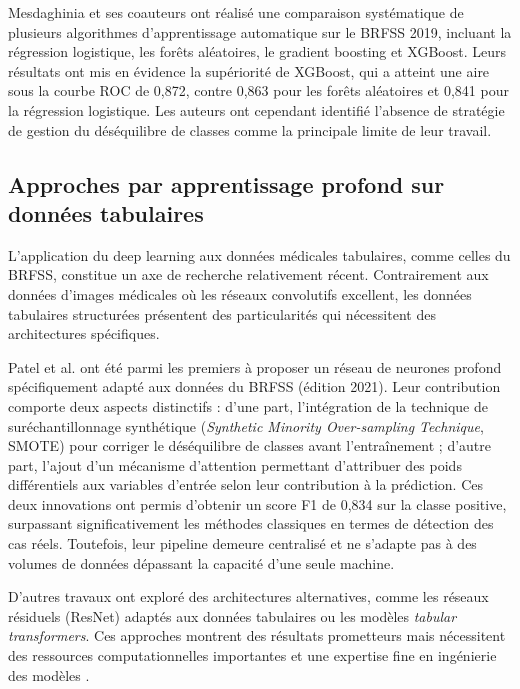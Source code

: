 \documentclass[12pt,a4paper]{report}
\begin{document}
Mesdaghinia et ses coauteurs \cite{mesdaghinia2022} ont réalisé une comparaison
systématique de plusieurs algorithmes d'apprentissage automatique sur le \acs{BRFSS}
2019, incluant la régression logistique, les forêts aléatoires, le gradient boosting
et XGBoost. Leurs résultats ont mis en évidence la supériorité de XGBoost, qui a
atteint une aire sous la courbe \acs{ROC} de 0,872, contre 0,863 pour les forêts
aléatoires et 0,841 pour la régression logistique. Les auteurs ont cependant
identifié l'absence de stratégie de gestion du déséquilibre de classes comme la
principale limite de leur travail.

\subsection{Approches par apprentissage profond sur données tabulaires}

L'application du deep learning aux données médicales tabulaires, comme celles du
\acs{BRFSS}, constitue un axe de recherche relativement récent. Contrairement aux
données d'images médicales où les réseaux convolutifs excellent, les données
tabulaires structurées présentent des particularités qui nécessitent des
architectures spécifiques.

Patel et al. \cite{patel2023} ont été parmi les premiers à proposer un réseau de
neurones profond spécifiquement adapté aux données du \acs{BRFSS} (édition 2021).
Leur contribution comporte deux aspects distinctifs : d'une part, l'intégration de la
technique de suréchantillonnage synthétique (\textit{Synthetic Minority Over-sampling
Technique}, \acs{SMOTE}) \cite{chawla2002} pour corriger le déséquilibre de classes
avant l'entraînement ; d'autre part, l'ajout d'un mécanisme d'attention permettant
d'attribuer des poids différentiels aux variables d'entrée selon leur contribution à
la prédiction. Ces deux innovations ont permis d'obtenir un score F1 de 0,834 sur la
classe positive, surpassant significativement les méthodes classiques en termes de
détection des cas réels. Toutefois, leur pipeline demeure centralisé et ne s'adapte
pas à des volumes de données dépassant la capacité d'une seule machine.

D'autres travaux ont exploré des architectures alternatives, comme les réseaux
résiduels (ResNet) adaptés aux données tabulaires ou les modèles \textit{tabular
transformers}. Ces approches montrent des résultats prometteurs mais nécessitent des
ressources computationnelles importantes et une expertise fine en ingénierie des
modèles \cite{goodfellow2016}.
\end{document}
